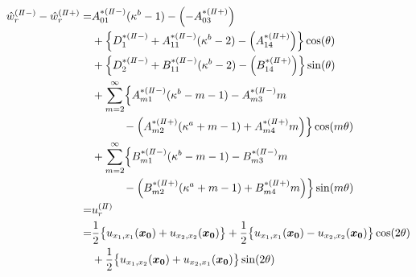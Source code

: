 \begin{align}
	\hat{w}_{r}^{(I\hspace{-.15em}I-)}-\hat{w}_{r}^{(I\hspace{-.15em}I+)} =
	&A_{01}^{*(I\hspace{-.15em}I-)}(\kappa^{b}-1)-\Bigl(-A_{03}^{*(I\hspace{-.15em}I+)}\Bigr)
	\nonumber
	\\
	&+\Bigl\{D_{1}^{*(I\hspace{-.15em}I-)}+A_{11}^{*(I\hspace{-.15em}I-)}(\kappa^{b}-2)
	-\Bigl(A_{14}^{*(I\hspace{-.15em}I+)}\Bigr)\Bigr\}\cos(\theta)
	\nonumber
	\\
	&+\Bigl\{D_{2}^{*(I\hspace{-.15em}I-)}+B_{11}^{*(I\hspace{-.15em}I-)}(\kappa^{b}-2)
	-\Bigl(B_{14}^{*(I\hspace{-.15em}I+)}\Bigr)\Bigr\}\sin(\theta)
	\nonumber
	\\
	&+\sum_{m=2}^{\infty}\Bigl\{A_{m1}^{*(I\hspace{-.15em}I-)}(\kappa^{b}-m-1)
	-A_{m3}^{*(I\hspace{-.15em}I-)}m
	\nonumber
	\\
	&\hspace{1.0cm}-\Bigl(A_{m2}^{*(I\hspace{-.15em}I+)}(\kappa^{a}+m-1)
	+A_{m4}^{*(I\hspace{-.15em}I+)}m\Bigr)\Bigr\}\cos(m\theta)
	\nonumber
	\\
	&+\sum_{m=2}^{\infty}\Bigl\{B_{m1}^{*(I\hspace{-.15em}I-)}(\kappa^{b}-m-1)
	-B_{m3}^{*(I\hspace{-.15em}I-)}m
	\nonumber
	\\
	&\hspace{1.0cm}-\Bigl(B_{m2}^{*(I\hspace{-.15em}I+)}(\kappa^{a}+m-1)
	+B_{m4}^{*(I\hspace{-.15em}I+)}m\Bigr)\Bigr\}\sin(m\theta)
	\nonumber
	\\
	=&u_{r}^{(I\hspace{-.15em}I)}
	\nonumber
	\\
	=&\frac{1}{2}\bigl\{u_{x_{1},x_{1}}(\bm{x_{0}})+u_{x_{2},x_{2}}(\bm{x_{0}})\bigr\}
	+\frac{1}{2}\bigl\{u_{x_{1},x_{1}}(\bm{x_{0}})-u_{x_{2},x_{2}}(\bm{x_{0}})\bigr\}\cos(2\theta)
	\nonumber
	\\
	&+\frac{1}{2}\bigl\{u_{x_{1},x_{2}}(\bm{x_{0}})+u_{x_{2},x_{1}}(\bm{x_{0}})\bigr\}\sin(2\theta)
	\label{eq:UR2eq}
\end{align}

